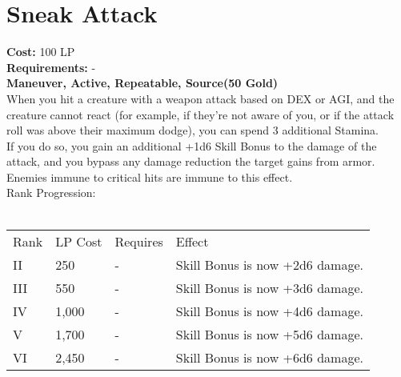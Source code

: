 \section{Sneak Attack}\label{maneuver:sneakAttack}
\textbf{Cost:} 100 LP\\
\textbf{Requirements:} -\\
\textbf{Maneuver, Active, Repeatable, Source(50 Gold)}\\
When you hit a creature with a weapon attack based on DEX or AGI, and the creature cannot react (for example, if they're not aware of you, or if the attack roll was above their maximum dodge), you can spend 3 additional Stamina.\\
If you do so, you gain an additional +1d6 Skill Bonus to the damage of the attack, and you bypass any damage reduction the target gains from armor.\\
Enemies immune to critical hits are immune to this effect.
\\
Rank Progression:\\
\\
\begin{tabular}{l | l | l | l}
	Rank & LP Cost & Requires & Effect\\
	II & 250 & - & Skill Bonus is now +2d6 damage.\\
	III & 550 & - &  Skill Bonus is now +3d6 damage.\\
	IV & 1,000 & - &  Skill Bonus is now +4d6 damage.\\
	V & 1,700 & - &  Skill Bonus is now +5d6 damage.\\
	VI & 2,450 & - &  Skill Bonus is now +6d6 damage.\\
\end{tabular}